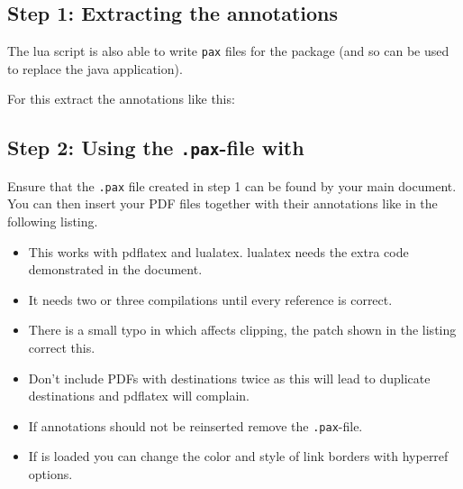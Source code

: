 \documentclass[DIV=12,parskip=half-,bibliography=totoc]{scrartcl}
\begin{document}
\subsection{Step 1: Extracting the annotations}
The lua script is also able to write \texttt{pax} files for the  package (and so can be used to replace the java application).

For this extract the annotations like this:



\subsection{Step 2: Using the \texttt{.pax}-file with }

Ensure that the \texttt{.pax} file created in step 1 can be found by your main document. You can then insert your PDF files together with their annotations like in the following listing.

\begin{itemize}
\item This works with pdflatex and lualatex. lualatex needs the extra code demonstrated in the document.
\item It needs two or three compilations until every reference is correct.
\item There is a small typo in  which affects clipping, the patch shown in the listing correct this.
\item Don't include PDFs with destinations twice as this will lead to duplicate destinations and pdflatex will complain.
\item If annotations should not be reinserted remove the \texttt{.pax}-file.
\item If  is loaded you can change the color and style of link borders with hyperref options.
\end{itemize}


\end{document}
